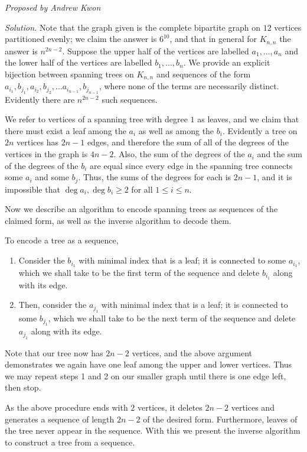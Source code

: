 \documentclass[10pt]{article}
\newcommand{\proposed}[1]
{
\vspace{5pt}
\noindent\textit{Proposed by #1}
}
\newcommand{\solution}
{
\vspace{5pt}
\noindent\textit{Solution.}\qquad
}
\begin{document}
\begin{enumerate}
\proposed{Andrew Kwon}

\solution Note that the graph given is the complete bipartite graph on $12$ vertices partitioned evenly; we claim the answer is $6^{10}$, and that in general for $K_{n,n}$ the answer is $n^{2n-2}$. Suppose the upper half of the vertices are labelled $a_{1}, \ldots, a_{n}$ and the lower half of the vertices are labelled $b_{1}, \ldots, b_{n}$. We provide an explicit bijection between spanning trees on $K_{n,n}$ and sequences of the form $a_{i_{1}}, b_{j_{1}}, a_{i_{2}}, b_{j_{2}}, \ldots a_{i_{n-1}}, b_{j_{n-1}}$, where none of the terms are necessarily distinct. Evidently there are $n^{2n-2}$ such sequences.

\par We refer to vertices of a spanning tree with degree $1$ as leaves, and we claim that there must exist a leaf among the $a_{i}$ as well as among the $b_{i}$. Evidently a tree on $2n$ vertices has $2n-1$ edges, and therefore the sum of all of the degrees of the vertices in the graph is $4n-2$. Also, the sum of the degrees of the $a_{i}$ and the sum of the degrees of the $b_{i}$ are equal since every edge in the spanning tree connects some $a_{i}$ and some $b_{j}$. Thus, the sums of the degrees for each is $2n-1$, and it is impossible that $\deg a_{i}, \deg b_{i} \geq 2$ for all $1 \leq i \leq n$. 

\par Now we describe an algorithm to encode spanning trees as sequences of the claimed form, as well as the inverse algorithm to decode them.

\par To encode a tree as a sequence, 
\begin{enumerate}
	\item Consider the $b_{i_{1}}$ with minimal index that is a leaf; it is connected to some $a_{i_{1}}$, which we shall take to be the first term of the sequence and delete $b_{i_{1}}$ along with its edge. 
	\item Then, consider the $a_{j_{1}}$ with minimal index that is a leaf; it is connected to some $b_{j_{1}}$, which we shall take to be the next term of the sequence and delete $a_{j_{1}}$ along with its edge. 
\end{enumerate}
Note that our tree now has $2n-2$ vertices, and the above argument demonstrates we again have one leaf among the upper and lower vertices. Thus we may repeat steps 1 and 2 on our smaller graph until there is one edge left, then stop.

\par As the above procedure ends with $2$ vertices, it deletes $2n-2$ vertices and generates a sequence of length $2n-2$ of the desired form. Furthermore, leaves of the tree never appear in the sequence. With this we present the inverse algorithm to construct a tree from a sequence.


\end{enumerate}
\end{document}
